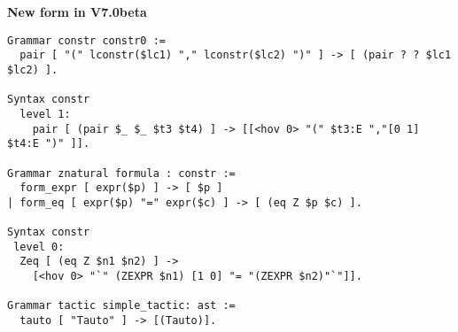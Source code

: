 \documentclass[11pt]{article}
\begin{document}
\medskip

{\bf New form in V7.0beta}

\begin{verbatim}
Grammar constr constr0 :=
  pair [ "(" lconstr($lc1) "," lconstr($lc2) ")" ] -> [ (pair ? ? $lc1 $lc2) ].

Syntax constr
  level 1:
    pair [ (pair $_ $_ $t3 $t4) ] -> [[<hov 0> "(" $t3:E ","[0 1] $t4:E ")" ]].

Grammar znatural formula : constr :=
  form_expr [ expr($p) ] -> [ $p ]
| form_eq [ expr($p) "=" expr($c) ] -> [ (eq Z $p $c) ].

Syntax constr
 level 0:
  Zeq [ (eq Z $n1 $n2) ] -> 
    [<hov 0> "`" (ZEXPR $n1) [1 0] "= "(ZEXPR $n2)"`"]].

Grammar tactic simple_tactic: ast :=
  tauto [ "Tauto" ] -> [(Tauto)].
\end{verbatim}
\end{document}
